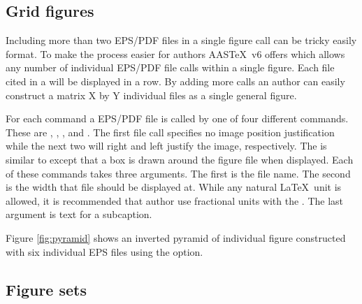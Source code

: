 \documentclass{aastex62}
\newcommand\aastex{AAS\TeX}
\newcommand\latex{La\TeX}
\begin{document}
\subsection{Grid figures}

Including more than two EPS/PDF files in a single figure call can be tricky
easily format.  To make the process easier for authors \aastex\ v6 offers
{\tt\string\gridline} which allows any number of individual EPS/PDF file
calls within a single figure.  Each file cited in a {\tt\string\gridline}
will be displayed in a row.  By adding more {\tt\string\gridline} calls an
author can easily construct a matrix X by Y individual files as a
single general figure.

For each {\tt\string\gridline} command a EPS/PDF file is called by one of
four different commands.  These are {\tt\string\fig},
{\tt\string\rightfig}, {\tt\string\leftfig}, and {\tt\string\boxedfig}.
The first file call specifies no image position justification while the
next two will right and left justify the image, respectively.  The
{\tt\string\boxedfig} is similar to {\tt\string\fig} except that a box is
drawn around the figure file when displayed. Each of these commands takes
three arguments.  The first is the file name.  The second is the width that
file should be displayed at.  While any natural \latex\ unit is allowed, it
is recommended that author use fractional units with the
{\tt\string\textwidth}.  The last argument is text for a subcaption.

Figure \ref{fig:pyramid} shows an inverted pyramid of individual
figure constructed with six individual EPS files using the
{\tt\string\gridline} option.

\begin{figure*}
\caption{Inverted pyramid figure of six individual files. The nova are
(a) V2491 Cyg, (b) HV Cet, (c) LMC 2009, (d) RS Oph, (e) U Sco, and
(f) KT Eri.\label{fig:pyramid}}
\end{figure*}

\subsection{Figure sets}
\end{document}
